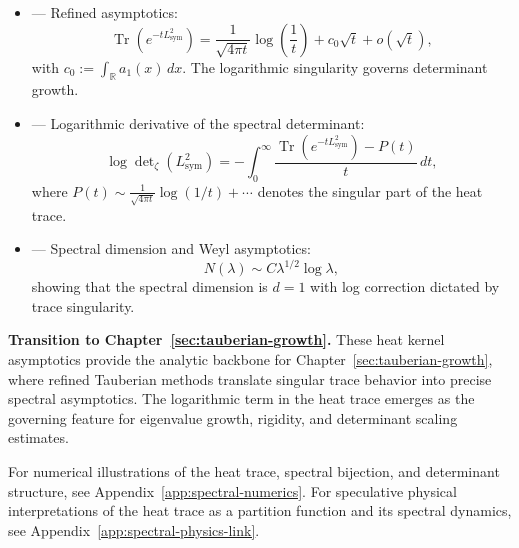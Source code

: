 \begin{itemize}
  \item {} — Refined asymptotics:
  \[
  \operatorname{Tr}(e^{-tL_{\mathrm{sym}}^2})
  = \frac{1}{\sqrt{4\pi t}} \log\left( \frac{1}{t} \right)
  + c_0 \sqrt{t} + o(\sqrt{t}),
  \]
  with \( c_0 := \int_{\mathbb{R}} a_1(x)\, dx \). The logarithmic singularity governs determinant growth.

  \item {} — Logarithmic derivative of the spectral determinant:
  \[
  \log \det\nolimits_{\zeta}(L_{\mathrm{sym}}^2)
  = -\int_0^\infty \frac{\operatorname{Tr}(e^{-t L_{\mathrm{sym}}^2}) - P(t)}{t} \, dt,
  \]
  where \( P(t) \sim \frac{1}{\sqrt{4\pi t}} \log(1/t) + \cdots \) denotes the singular part of the heat trace.

  \item {} — Spectral dimension and Weyl asymptotics:
  \[
  N(\lambda) \sim C \lambda^{1/2} \log \lambda,
  \]
  showing that the spectral dimension is \( d = 1 \) with log correction dictated by trace singularity.
\end{itemize}

\medskip

\noindent\textbf{Transition to Chapter~\ref{sec:tauberian-growth}.}  
These heat kernel asymptotics provide the analytic backbone for Chapter~\ref{sec:tauberian-growth}, where refined Tauberian methods translate singular trace behavior into precise spectral asymptotics. The logarithmic term in the heat trace emerges as the governing feature for eigenvalue growth, rigidity, and determinant scaling estimates.

\medskip
\noindent
For numerical illustrations of the heat trace, spectral bijection, and determinant structure, see Appendix~\ref{app:spectral-numerics}. For speculative physical interpretations of the heat trace as a partition function and its spectral dynamics, see Appendix~\ref{app:spectral-physics-link}.
